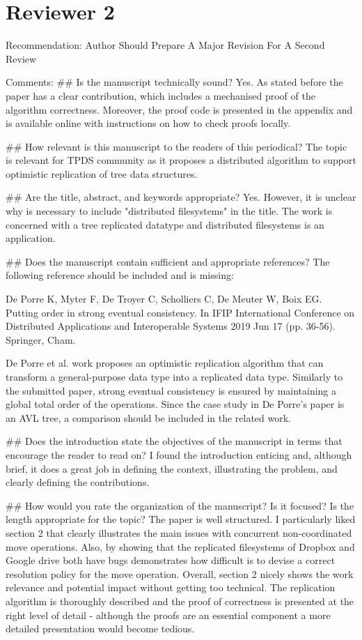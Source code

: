 \documentclass[10pt]{article}
\begin{document}
\section{Reviewer 2}

\begin{spverbatim}
Recommendation: Author Should Prepare A Major Revision For A Second Review

Comments:
## Is the manuscript technically sound?
Yes. As stated before the paper has a clear contribution, which includes a mechanised proof of the algorithm correctness. Moreover, the proof code is presented in the appendix and is available online with instructions on how to check proofs locally.

## How relevant is this manuscript to the readers of this periodical?
The topic is relevant for TPDS community as it proposes a distributed algorithm to support optimistic replication of tree data structures.

## Are the title, abstract, and keywords appropriate?
Yes. However, it is unclear why is necessary to include "distributed filesystems" in the title. The work is concerned with a tree replicated datatype and distributed filesystems is an application.

## Does the manuscript contain sufficient and appropriate references?
The following reference should be included and is missing:

De Porre K, Myter F, De Troyer C, Scholliers C, De Meuter W, Boix EG. Putting order in strong eventual consistency. In IFIP International Conference on Distributed Applications and Interoperable Systems 2019 Jun 17 (pp. 36-56). Springer, Cham.

De Porre et al. work proposes an optimistic replication algorithm that can transform a general-purpose data type into a replicated data type. Similarly to the submitted paper, strong eventual consistency is ensured by maintaining a global total order of the operations. Since the case study in De Porre's paper is an AVL tree, a comparison should be included in the related work.

## Does the introduction state the objectives of the manuscript in terms that encourage the reader to read on?
I found the introduction enticing and, although brief, it does a great job in defining the context, illustrating the problem, and clearly defining the contributions.

## How would you rate the organization of the manuscript? Is it focused? Is the length appropriate for the topic?
The paper is well structured. I particularly liked section 2 that clearly illustrates the main issues with concurrent non-coordinated move operations. Also, by showing that the replicated filesystems of Dropbox and Google drive both have bugs demonstrates how difficult is to devise a correct resolution policy for the move operation. Overall, section 2 nicely shows the work relevance and potential impact without getting too technical.
The replication algorithm is thoroughly described and the proof of correctness is presented at the right level of detail - although the proofs are an essential component a more detailed presentation would become tedious.  


\end{spverbatim}
\end{document}
